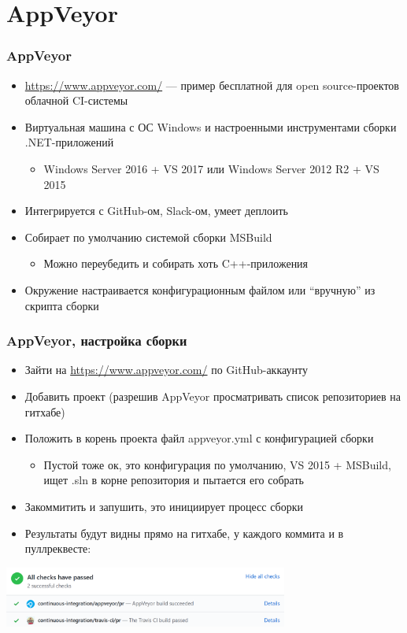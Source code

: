 \documentclass[xetex,mathserif,serif]{beamer}
\begin{document}
	\section{AppVeyor}

	\begin{frame}
		\frametitle{AppVeyor}
		\begin{itemize}
			\item \url{https://www.appveyor.com/} --- пример бесплатной для open source-проектов облачной CI-системы
			\item Виртуальная машина с ОС Windows и настроенными инструментами сборки .NET-приложений
			\begin{itemize}
				\item Windows Server 2016 + VS 2017 или Windows Server 2012 R2 + VS 2015
			\end{itemize}
			\item Интегрируется с GitHub-ом, Slack-ом, умеет деплоить
			\item Собирает по умолчанию системой сборки MSBuild
			\begin{itemize}
				\item Можно переубедить и собирать хоть C++-приложения
			\end{itemize}
			\item Окружение настраивается конфигурационным файлом или ``вручную'' из скрипта сборки
		\end{itemize}
	\end{frame}

	\begin{frame}
		\frametitle{AppVeyor, настройка сборки}
		\begin{itemize}
			\item Зайти на \url{https://www.appveyor.com/} по GitHub-аккаунту
			\item Добавить проект (разрешив AppVeyor просматривать список репозиториев на гитхабе)
			\item Положить в корень проекта файл appveyor.yml с конфигурацией сборки
			\begin{itemize}
				\item Пустой тоже ок, это конфигурация по умолчанию, VS 2015 + MSBuild, ищет .sln в корне репозитория и пытается его собрать
			\end{itemize}
			\item Закоммитить и запушить, это инициирует процесс сборки
			\item Результаты будут видны прямо на гитхабе, у каждого коммита и в пуллреквесте:
		\end{itemize}
		\begin{center}
			\includegraphics[width=0.7\textwidth]{appVeyorSuccess.png}
		\end{center}
	\end{frame}
\end{document}
